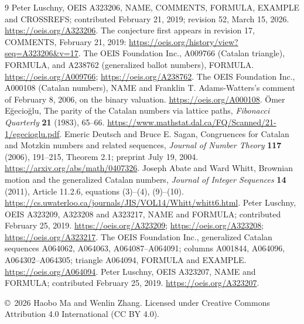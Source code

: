 \documentclass[11pt]{article}
\begin{document}
\clearpage
\begin{thebibliography}{9}
 Peter Luschny, OEIS A323206, NAME, COMMENTS, FORMULA,
EXAMPLE and CROSSREFS; contributed February 21, 2019; revision 52,
March 15, 2026. \url{https://oeis.org/A323206}.
The conjecture first appears in revision 17, COMMENTS, February 21, 2019:
\url{https://oeis.org/history/view?seq=A323206&v=17}.
 The OEIS Foundation Inc., A009766 (Catalan triangle),
FORMULA, and A238762 (generalized ballot numbers), FORMULA.
\url{https://oeis.org/A009766}; \url{https://oeis.org/A238762}.
 The OEIS Foundation Inc., A000108 (Catalan numbers),
NAME and Franklin T. Adams-Watters's comment of February 8, 2006,
on the binary valuation. \url{https://oeis.org/A000108}.
 \"Omer E\u{g}ecio\u{g}lu,
The parity of the Catalan numbers via lattice paths,
\emph{Fibonacci Quarterly} \textbf{21} (1983), 65--66.
\url{https://www.mathstat.dal.ca/FQ/Scanned/21-1/egecioglu.pdf}.
 Emeric Deutsch and Bruce E. Sagan,
Congruences for Catalan and Motzkin numbers and related sequences,
\emph{Journal of Number Theory} \textbf{117} (2006), 191--215,
Theorem 2.1; preprint July 19, 2004.
\url{https://arxiv.org/abs/math/0407326}.
 Joseph Abate and Ward Whitt,
Brownian motion and the generalized Catalan numbers,
\emph{Journal of Integer Sequences} \textbf{14} (2011), Article 11.2.6,
equations (3)--(4), (9)--(10).
\url{https://cs.uwaterloo.ca/journals/JIS/VOL14/Whitt/whitt6.html}.
 Peter Luschny, OEIS A323209, A323208 and A323217,
NAME and FORMULA; contributed February 25, 2019.
\url{https://oeis.org/A323209}; \url{https://oeis.org/A323208};
\url{https://oeis.org/A323217}.
 The OEIS Foundation Inc., generalized Catalan sequences
A064062, A064063, A064087--A064091; columns A001844, A064096,
A064302--A064305; triangle A064094, FORMULA and EXAMPLE.
\url{https://oeis.org/A064094}.
 Peter Luschny, OEIS A323207, NAME and FORMULA;
contributed February 25, 2019. \url{https://oeis.org/A323207}.
\end{thebibliography}
\medskip\noindent\small
\copyright\ 2026 Haobo Ma and Wenlin Zhang.
Licensed under Creative Commons Attribution 4.0 International (CC BY 4.0).
\end{document}
